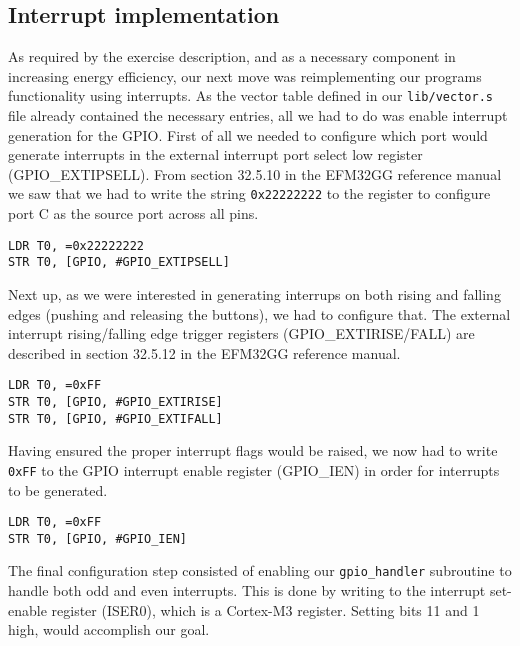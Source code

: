 \subsection{Interrupt implementation}
\label{sec:interrupt-implementation}

As required by the exercise description, and as a necessary component in increasing energy efficiency, our next move was reimplementing our programs functionality using interrupts. As the vector table defined in our \texttt{lib/vector.s} file already contained the necessary entries, all we had to do was enable interrupt generation for the GPIO. First of all we needed to configure which port would generate interrupts in the external interrupt port select low register (GPIO\_EXTIPSELL). From section 32.5.10 in the EFM32GG reference manual \cite{efm32ggref} we saw that we had to write the string \texttt{0x22222222} to the register to configure port C as the source port across all pins.

\begin{lstlisting}[label=interrupt-port-select, caption=Configuring GPIO\_EXTIPSELL]
LDR T0, =0x22222222
STR T0, [GPIO, #GPIO_EXTIPSELL]
\end{lstlisting}

Next up, as we were interested in generating interrups on both rising and falling edges (pushing and releasing the buttons), we had to configure that. The external interrupt rising/falling edge trigger registers (GPIO\_EXTIRISE/FALL) are described in section 32.5.12 in the EFM32GG reference manual. \cite{efm32ggref}

\begin{lstlisting}[label=gpio-edge-config, caption=Rising/falling edge]
LDR T0, =0xFF
STR T0, [GPIO, #GPIO_EXTIRISE]
STR T0, [GPIO, #GPIO_EXTIFALL]
\end{lstlisting}

Having ensured the proper interrupt flags would be raised, we now had to write \texttt{0xFF} to the GPIO interrupt enable register (GPIO\_IEN) in order for interrupts to be generated.

\begin{lstlisting}[label=gpio-ien-config, caption=Enable interrupts in GPIO\_IEN]
LDR T0, =0xFF
STR T0, [GPIO, #GPIO_IEN]
\end{lstlisting}

The final configuration step consisted of enabling our \texttt{gpio\_handler} subroutine to handle both odd and even interrupts. This is done by writing to the interrupt set-enable register (ISER0), which is a Cortex-M3 register. Setting bits 11 and 1 high, would accomplish our goal.

